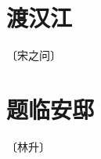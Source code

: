 \documentclass[12pt,UTF-8,openany]{ctexbook}
\begin{document}
\vspace{8pt}


\section{渡汉江}

\begin{center}
    \vspace{10pt}
    
    \begin{normalsize}
        
        〔宋之问〕
        
    \end{normalsize}
    
    \vspace{8pt}
    
    \begin{large}
        
        
        
    \end{large}
    
\end{center}

\vspace{8pt}


\section{题临安邸}

\begin{center}
    \vspace{10pt}
    
    \begin{normalsize}
        
        〔林升〕
        
    \end{normalsize}
    
    \vspace{8pt}
    
    \begin{large}
        
        
        
    \end{large}
    
\end{center}
\end{document}
